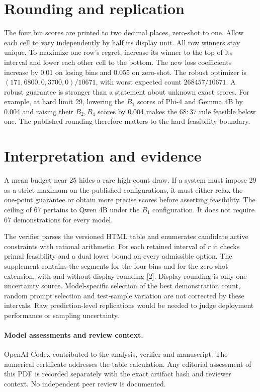 \documentclass[11pt]{article}
\begin{document}
\section{Rounding and replication}
The four bin scores are printed to two decimal places, zero-shot to one. Allow each cell to vary independently by half its display unit. All row winners stay unique. To maximize one row's regret, increase its winner to the top of its interval and lower each other cell to the bottom. The new loss coefficients increase by 0.01 on losing bins and 0.055 on zero-shot. The robust optimizer is $(171,6800,0,3700,0)/10671$, with worst expected count $268457/10671$. A robust guarantee is stronger than a statement about unknown exact scores. For example, at hard limit 29, lowering the $B_1$ scores of Phi-4 and Gemma 4B by 0.004 and raising their $B_2,B_4$ scores by 0.004 makes the $68:37$ rule feasible below one. The published rounding therefore matters to the hard feasibility boundary.

\newpage
\section{Interpretation and evidence}
A mean budget near 25 hides a rare high-count draw. If a system must impose 29 as a strict maximum on the published configurations, it must either relax the one-point guarantee or obtain more precise scores before asserting feasibility. The ceiling of 67 pertains to Qwen 4B under the $B_1$ configuration. It does not require 67 demonstrations for every model.

The verifier parses the versioned HTML table and enumerates candidate active constraints with rational arithmetic. For each retained interval of $r$ it checks primal feasibility and a dual lower bound on every admissible option. The supplement contains the segments for the four bins and for the zero-shot extension, with and without display rounding [2]. Display rounding is only one uncertainty source. Model-specific selection of the best demonstration count, random prompt selection and test-sample variation are not corrected by these intervals. Raw prediction-level replications would be needed to judge deployment performance or sampling uncertainty.

\paragraph{Model assessments and review context.}
OpenAI Codex contributed to the analysis, verifier and manuscript. The numerical certificate addresses the table calculation. Any editorial assessment of this PDF is recorded separately with the exact artifact hash and reviewer context. No independent peer review is documented.
\end{document}
